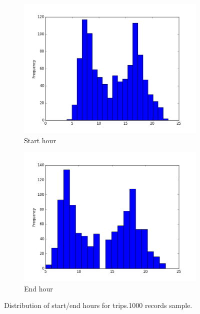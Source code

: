 \documentclass{article}
\begin{document}
\begin{figure}[H]
  \centering
  \begin{subfigure}[b]{.45\textwidth}
  	\centering
  	\includegraphics[width=\linewidth]{./images/start_hour_hist.png}
  	\caption{Start hour}
  \end{subfigure}
  \begin{subfigure}[b]{.45\textwidth}
  	\centering
  	\includegraphics[width=\linewidth]{./images/end_hour_hist.png}
  	\caption{End hour}
  \end{subfigure}
  \caption{Distribution of start/end hours for trips.1000 records sample.}
  	\label{fig:preprocessing/start_end_hour}
\end{figure}
\end{document}
